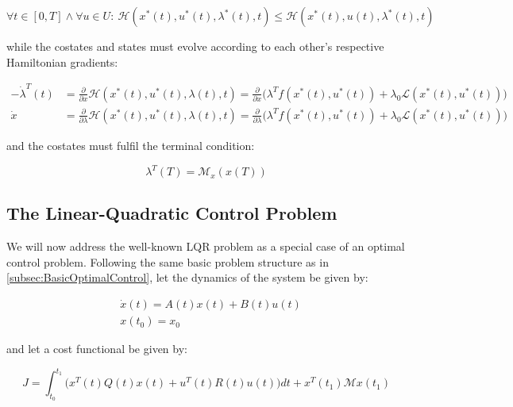 \begin{equation}\label{eq:MinimizeHamiltonian}
\forall t \in [0,T] \wedge \forall u \in U: \ \mathcal{H}(x^*(t),u^*(t),\lambda^*(t),t) \leq \mathcal{H}(x^*(t),u(t),\lambda^*(t),t)
\end{equation}

while the costates and states must evolve according to each other's respective Hamiltonian gradients:

\begin{align}
	-\dot{\lambda}^T(t) &= \frac{\partial}{\partial x}\mathcal{H}(x^*(t),u^*(t),\lambda(t),t) = \frac{\partial}{\partial x} \Big( \lambda^T f(x^*(t),u^*(t)) + \lambda_0\mathcal{L}(x^*(t),u^*(t)) \Big) \label{eq:LagrangeVariationCondition} \\
	\dot{x} &= \frac{\partial}{\partial \lambda} \mathcal{H}(x^*(t),u^*(t),\lambda(t),t) = \frac{\partial}{\partial \lambda} \Big( \lambda^T f(x^*(t),u^*(t)) + \lambda_0\mathcal{L}(x^*(t),u^*(t)) \Big) \label{eq:StateVariationCondition}
\end{align}

and the costates must fulfil the terminal condition:

\begin{equation}\label{eq:LagrangeTerminalCondition}
 \lambda^T(T) = \mathcal{M}_x(x(T))
\end{equation}

\clearpage

\subsection{The Linear-Quadratic Control Problem}\label{subsec:LQR}

We will now address the well-known LQR problem as a special case of an optimal control problem. Following the same basic problem structure as in \cref{subsec:BasicOptimalControl}, let the dynamics of the system be given by:

\begin{align}
	&\dot{x}(t) = A(t)x(t) + B(t)u(t) \label{eq:TimeVaryingLinearSystem} \\
	&x(t_0) = x_0
\end{align}

and let a cost functional be given by:

\begin{equation}
 J = \int_{t_0}^{t_1} \big(x^T(t)Q(t)x(t) + u^T(t)R(t)u(t)\big)dt + x^T(t_1)\mathcal{M}x(t_1)
\end{equation}


